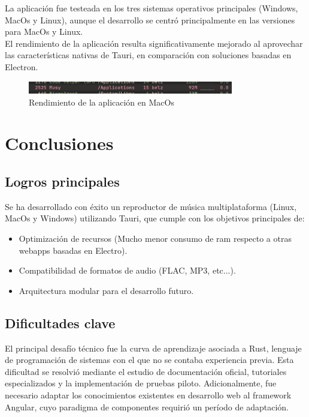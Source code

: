 \documentclass[11pt, a4paper]{article}
\begin{document}
        La aplicación fue testeada en los tres sistemas operativos principales (Windows, MacOs y Linux), aunque el desarrollo se centró principalmente en las versiones para MacOs y Linux. \\

        El rendimiento de la aplicación resulta significativamente mejorado al aprovechar las características nativas de Tauri, en comparación con soluciones basadas en Electron. \\

        \begin{figure}[h!]
            \centering
            \includegraphics[width=0.8\textwidth]{media/imagemusyram.png}
            \caption{Rendimiento de la aplicación en MacOs}
            \label{fig:ejemplo}
        \end{figure}

\section{Conclusiones}

        \subsection{Logros principales}

        Se ha desarrollado con éxito un reproductor de música multiplataforma (Linux, MacOs y Windows) utilizando Tauri, que cumple con los objetivos principales de:

        \begin{itemize}
            \item Optimización de recursos (Mucho menor consumo de ram respecto a otras webapps basadas en Electro).
            \item Compatibilidad de formatos de audio (FLAC, MP3, etc...).
            \item Arquitectura modular para el desarrollo futuro.
        \end{itemize}

        \subsection{Dificultades clave}

        El principal desafío técnico fue la curva de aprendizaje asociada a Rust, lenguaje de programación de sistemas con el que no se contaba experiencia previa. Esta dificultad se resolvió mediante el estudio de documentación oficial, tutoriales especializados y la implementación de pruebas piloto. Adicionalmente, fue necesario adaptar los conocimientos existentes en desarrollo web al framework Angular, cuyo paradigma de componentes requirió un período de adaptación.
\end{document}
